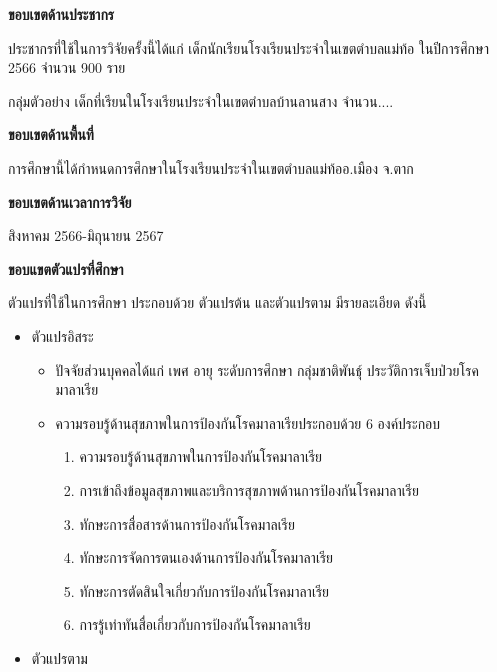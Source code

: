 \begin{titlepage}
\begin{enumerate}
          \textbf{ขอบเขตด้านประชากร}

          ประชากรที่ใช้ในการวิจัยครั้งนี้ได้แก่ เด็กนักเรียนโรงเรียนประจำในเขตตำบลแม่ท้อ ในปีการศึกษา 2566 จำนวน 900 ราย

          กลุ่มตัวอย่าง เด็กที่เรียนในโรงเรียนประจำในเขตตำบลบ้านลานสาง จำนวน....

          \textbf{ขอบเขตด้านพื้นที่}

          การศึกษานี้ได้กำหนดการศึกษาในโรงเรียนประจำในเขตตำบลแม่ท้ออ.เมือง จ.ตาก

          \textbf{ขอบเขตด้านเวลาการวิจัย}

          สิงหาคม 2566-มิถุนายน 2567

          \textbf{ขอบแขตตัวแปรที่ศึกษา}

          ตัวแปรที่ใช้ในการศึกษา ประกอบด้วย ตัวแปรต้น และตัวแปรตาม มีรายละเอียด ดังนี้

          \begin{itemize}
            \item ตัวแปรอิสระ

                  \begin{itemize}
                    \item ปัจจัยส่วนบุคคลได้แก่ เพศ อายุ ระดับการศึกษา กลุ่มชาติพันธุ์ ประวัติการเจ็บป่วยโรคมาลาเรีย
                    \item ความรอบรู้ด้านสุขภาพในการป้องกันโรคมาลาเรียประกอบด้วย 6 องค์ประกอบ

                          \begin{enumerate}[label=\textnormal{\arabic*.}]
                            \item ความรอบรู้ด้านสุขภาพในการป้องกันโรคมาลาเรีย
                            \item การเข้าถึงข้อมูลสุขภาพและบริการสุขภาพด้านการป้องกันโรคมาลาเรีย
                            \item ทักษะการสื่อสารด้านการป้องกันโรคมาลเรีย
                            \item ทักษะการจัดการตนเองด้านการป้องกันโรคมาลาเรีย
                            \item ทักษะการตัดสินใจเกี่ยวกับการป้องกันโรคมาลาเรีย
                            \item การรู้เท่าทันสื่อเกี่ยวกับการป้องกันโรคมาลาเรีย
                          \end{enumerate}
                  \end{itemize}

            \item ตัวแปรตาม


\end{itemize}
\end{enumerate}
\end{titlepage}
